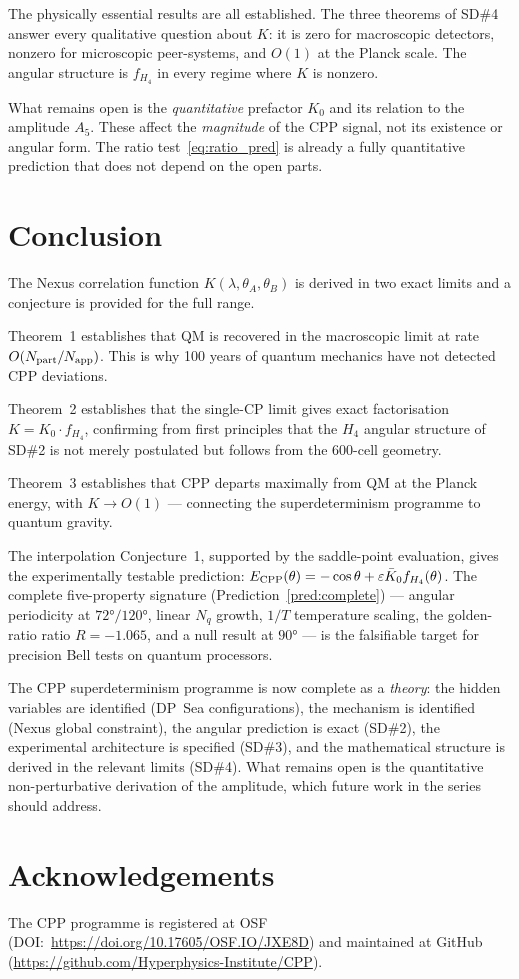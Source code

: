 \documentclass[11pt,letterpaper]{article}
\newcommand{\eps}{\varepsilon}
\newcommand{\Napp}{N_{\rm app}}
\newcommand{\Npart}{N_{\rm part}}
\begin{document}
The physically essential results are all established.  The three
theorems of SD\#4 answer every qualitative question about $K$:
it is zero for macroscopic detectors, nonzero for microscopic
peer-systems, and $O(1)$ at the Planck scale.  The angular
structure is $f_{H_4}$ in every regime where $K$ is nonzero.

What remains open is the \emph{quantitative} prefactor $K_0$ and
its relation to the amplitude $A_5$.  These affect the
\emph{magnitude} of the CPP signal, not its existence or angular
form.  The ratio test~\eqref{eq:ratio_pred} is already a fully
quantitative prediction that does not depend on the open parts.

\section{Conclusion}

The Nexus correlation function $K(\lambda,\theta_A,\theta_B)$ is
derived in two exact limits and a conjecture is provided for the
full range.

Theorem~1 establishes that QM is recovered in the macroscopic
limit at rate $O(\Npart/\Napp)$.  This is why 100 years of quantum
mechanics have not detected CPP deviations.

Theorem~2 establishes that the single-CP limit gives exact
factorisation $K = K_0 \cdot f_{H_4}$, confirming from first
principles that the $H_4$ angular structure of SD\#2 is not merely
postulated but follows from the 600-cell geometry.

Theorem~3 establishes that CPP departs maximally from QM at the
Planck energy, with $K \to O(1)$ — connecting the superdeterminism
programme to quantum gravity.

The interpolation Conjecture~1, supported by the saddle-point
evaluation, gives the experimentally testable prediction:
$E_{\rm CPP}(\theta) = -\cos\theta + \eps\bar K_0 f_{H_4}(\theta)$.
The complete five-property signature (Prediction~\ref{pred:complete})
— angular periodicity at $72°/120°$, linear $N_q$ growth, $1/T$
temperature scaling, the golden-ratio ratio $R = -1.065$, and a
null result at $90°$ — is the falsifiable target for precision
Bell tests on quantum processors.

The CPP superdeterminism programme is now complete as a \emph{theory}:
the hidden variables are identified (DP~Sea configurations), the
mechanism is identified (Nexus global constraint), the angular
prediction is exact (SD\#2), the experimental architecture is
specified (SD\#3), and the mathematical structure is derived in
the relevant limits (SD\#4).  What remains open is the quantitative
non-perturbative derivation of the amplitude, which future work
in the series should address.





\section*{Acknowledgements}
The CPP programme is registered at OSF (DOI:~\url{https://doi.org/10.17605/OSF.IO/JXE8D}) and maintained at GitHub (\url{https://github.com/Hyperphysics-Institute/CPP}).
\end{document}
